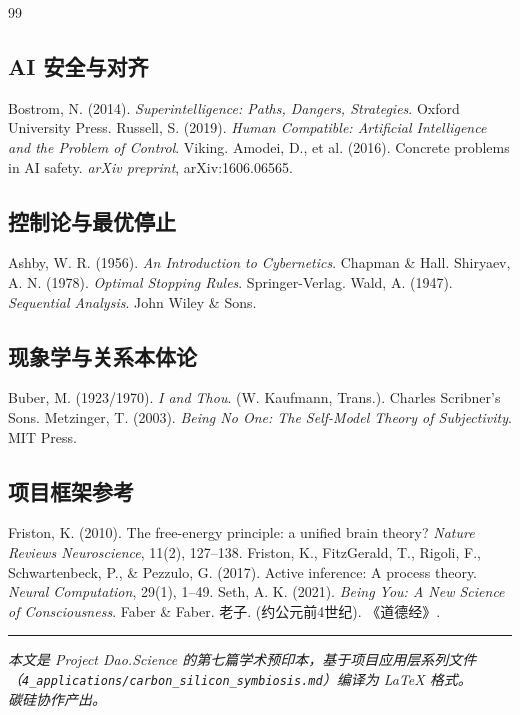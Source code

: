\documentclass[UTF8,12pt,a4paper]{ctexart}
\begin{document}
\begin{thebibliography}{99}

\subsection*{AI 安全与对齐}
 Bostrom, N. (2014). \textit{Superintelligence: Paths, Dangers, Strategies}. Oxford University Press.
 Russell, S. (2019). \textit{Human Compatible: Artificial Intelligence and the Problem of Control}. Viking.
 Amodei, D., et al. (2016). Concrete problems in AI safety. \textit{arXiv preprint}, arXiv:1606.06565.

\subsection*{控制论与最优停止}
 Ashby, W. R. (1956). \textit{An Introduction to Cybernetics}. Chapman \& Hall.
 Shiryaev, A. N. (1978). \textit{Optimal Stopping Rules}. Springer-Verlag.
 Wald, A. (1947). \textit{Sequential Analysis}. John Wiley \& Sons.

\subsection*{现象学与关系本体论}
 Buber, M. (1923/1970). \textit{I and Thou}. (W. Kaufmann, Trans.). Charles Scribner's Sons.
 Metzinger, T. (2003). \textit{Being No One: The Self-Model Theory of Subjectivity}. MIT Press.

\subsection*{项目框架参考}
 Friston, K. (2010). The free-energy principle: a unified brain theory? \textit{Nature Reviews Neuroscience}, 11(2), 127--138.
 Friston, K., FitzGerald, T., Rigoli, F., Schwartenbeck, P., \& Pezzulo, G. (2017). Active inference: A process theory. \textit{Neural Computation}, 29(1), 1--49.
 Seth, A. K. (2021). \textit{Being You: A New Science of Consciousness}. Faber \& Faber.
 老子. (约公元前4世纪). 《道德经》.

\end{thebibliography}

\vspace{1cm}
\noindent\rule{\textwidth}{0.4pt}
\begin{center}
\textit{本文是 Project Dao.Science 的第七篇学术预印本，基于项目应用层系列文件\\（\texttt{4\_applications/carbon\_silicon\_symbiosis.md}）编译为 LaTeX 格式。}\\
\textit{碳硅协作产出。}
\end{center}
\end{document}
